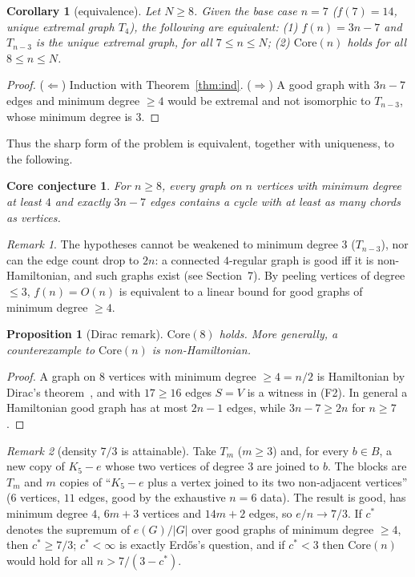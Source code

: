 \documentclass[11pt]{amsart}
\newtheorem{proposition}{Proposition}
\newtheorem{corollary}{Corollary}
\newtheorem*{corecon}{Core conjecture}
\theoremstyle{remark}
\newtheorem{remark}{Remark}
\newcommand{\Tm}[1]{T_{#1}}
\begin{document}
\begin{corollary}[equivalence]\label{cor:equiv}
Let $N\ge8$. Given the base case $n=7$ ($f(7)=14$, unique extremal graph $\Tm4$), the following are equivalent: (1) $f(n)=3n-7$ and $\Tm{n-3}$ is the unique extremal graph, for all $7\le n\le N$; (2) $\mathrm{Core}(n)$ holds for all $8\le n\le N$.
\end{corollary}
\begin{proof}
($\Leftarrow$) Induction with Theorem~\ref{thm:ind}. ($\Rightarrow$) A good graph with $3n-7$ edges and minimum degree $\ge4$ would be extremal and not isomorphic to $\Tm{n-3}$, whose minimum degree is $3$.
\end{proof}

Thus the sharp form of the problem is equivalent, together with uniqueness, to the following.

\begin{corecon}
For $n\ge8$, every graph on $n$ vertices with minimum degree at least $4$ and exactly $3n-7$ edges contains a cycle with at least as many chords as vertices.
\end{corecon}

\begin{remark}
The hypotheses cannot be weakened to minimum degree $3$ ($\Tm{n-3}$), nor can the edge count drop to $2n$: a connected $4$-regular graph is good iff it is non-Hamiltonian, and such graphs exist (see Section~7). By peeling vertices of degree $\le3$, $f(n)=O(n)$ is equivalent to a linear bound for good graphs of minimum degree $\ge4$.
\end{remark}

\begin{proposition}[Dirac remark]\label{prop:dirac}
$\mathrm{Core}(8)$ holds. More generally, a counterexample to $\mathrm{Core}(n)$ is non-Hamiltonian.
\end{proposition}
\begin{proof}
A graph on $8$ vertices with minimum degree $\ge4=n/2$ is Hamiltonian by Dirac's theorem~\cite{Dir52}, and with $17\ge16$ edges $S=V$ is a witness in (F2). In general a Hamiltonian good graph has at most $2n-1$ edges, while $3n-7\ge 2n$ for $n\ge7$.
\end{proof}

\begin{remark}[density $7/3$ is attainable]
Take $\Tm m$ ($m\ge3$) and, for every $b\in B$, a new copy of $K_5-e$ whose two vertices of degree $3$ are joined to $b$. The blocks are $\Tm m$ and $m$ copies of ``$K_5-e$ plus a vertex joined to its two non-adjacent vertices'' ($6$ vertices, $11$ edges, good by the exhaustive $n=6$ data). The result is good, has minimum degree $4$, $6m+3$ vertices and $14m+2$ edges, so $e/n\to7/3$. If $c^\ast$ denotes the supremum of $e(G)/|G|$ over good graphs of minimum degree $\ge4$, then $c^\ast\ge7/3$; $c^\ast<\infty$ is exactly Erd\H{o}s's question, and if $c^\ast<3$ then $\mathrm{Core}(n)$ would hold for all $n>7/(3-c^\ast)$.
\end{remark}
\end{document}
